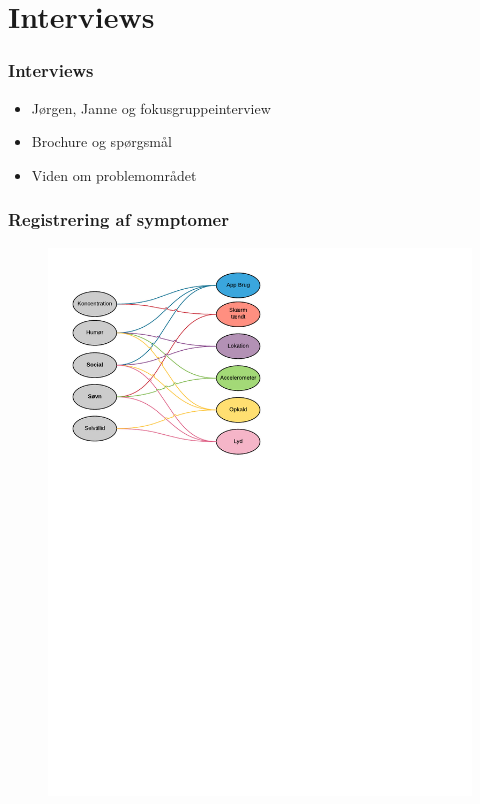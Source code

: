\section{Interviews}

\begin{frame}
\frametitle{Interviews}
\begin{itemize}
	\item Jørgen, Janne og fokusgruppeinterview
	\item Brochure og spørgsmål
	\item Viden om problemområdet
\end{itemize}
\end{frame}

\begin{frame}
\frametitle{Registrering af symptomer}
\begin{figure}
	\includegraphics[scale=0.7, trim= 1cm 17cm 10cm 1cm, clip]{graphics/kobling.pdf}
\end{figure}
\end{frame}

